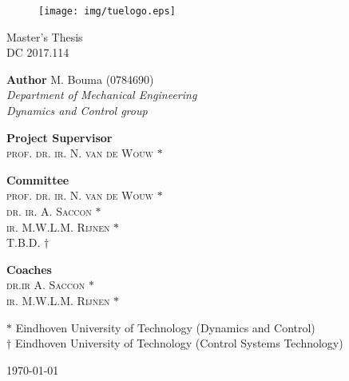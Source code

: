 \documentclass[DC2017114Bouma.tex]{subfiles}
\begin{document}
\begin{figure}[H]
\centering
\begin{minipage}{.495\textwidth}
  \texttt{[image: img/tuelogo.eps]}
\end{minipage}
\end{figure}  

\begin{center}

\vspace*{80pt}
\huge{\textbf{\mytitle}}

\vspace*{30pt}
{\LARGE Master's Thesis} \\
{\Large DC 2017.114}

\end{center}

\vspace{\fill}
\begin{minipage}[t]{0.4\textwidth}
	\begin{flushleft} 
		\textbf{Author}
		\vskip3pt
		M. Bouma (0784690)\\
		\textit{Department of Mechanical Engineering\\
			Dynamics and Control group}
	\end{flushleft}
\end{minipage}
\hfill
\begin{minipage}[t]{0.4\textwidth}
	\begin{flushright} 
		\textbf{Project Supervisor}\\
		\textsc{prof. dr. ir. N. van de Wouw} $*$\\
	\end{flushright}
\end{minipage}
\bigskip

\begin{minipage}[t]{0.4\textwidth}
	\begin{flushleft} 
		\textbf{Committee}\\
		\textsc{prof. dr. ir. N. van de Wouw} $*$\\
		\textsc{dr. ir. A. Saccon} $*$\\
		\textsc{ir. M.W.L.M. Rijnen} $*$\\
		\textsc{T.B.D.} $\dagger$
	\end{flushleft}
\end{minipage}
\hfill
\begin{minipage}[t]{0.4\textwidth}
	\begin{flushright} 
		\textbf{Coaches}\\
		\textsc{dr.ir A. Saccon} $*$\\
		\textsc{ir. M.W.L.M. Rijnen} $*$\\
	\end{flushright}
\end{minipage}
\vfill

{\small $*$ Eindhoven University of Technology (Dynamics and Control)}\\
{\small $\dagger$ Eindhoven University of Technology (Control Systems Technology)}
\bigskip

\today
\end{document}
